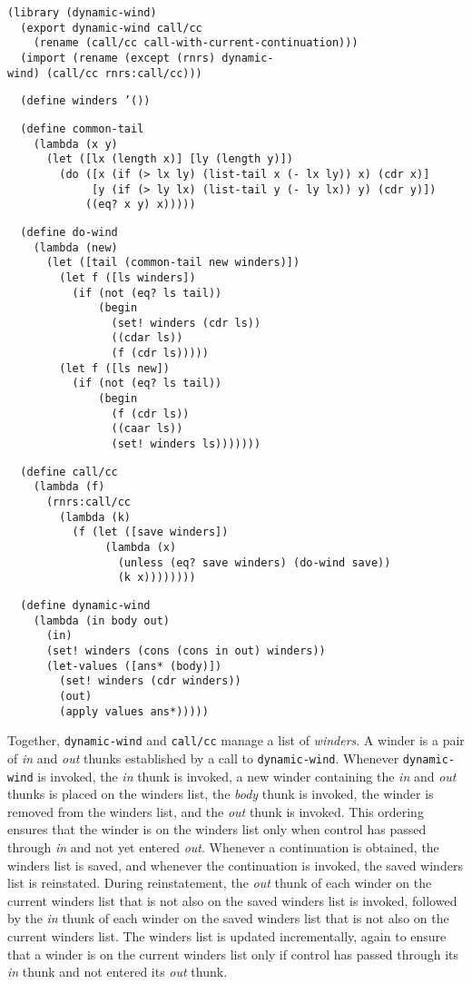 \begin{alltt}
(library (dynamic-wind)
  (export dynamic-wind call/cc
    (rename (call/cc call-with-current-continuation)))
  (import (rename (except (rnrs) dynamic-wind) (call/cc rnrs:call/cc)))

  (define winders '())

  (define common-tail
    (lambda (x y)
      (let ([lx (length x)] [ly (length y)])
        (do ([x (if (\textgreater{} lx ly) (list-tail x (- lx ly)) x) (cdr x)]
             [y (if (\textgreater{} ly lx) (list-tail y (- ly lx)) y) (cdr y)])
            ((eq? x y) x)))))

  (define do-wind
    (lambda (new)
      (let ([tail (common-tail new winders)])
        (let f ([ls winders])
          (if (not (eq? ls tail))
              (begin
                (set! winders (cdr ls))
                ((cdar ls))
                (f (cdr ls)))))
        (let f ([ls new])
          (if (not (eq? ls tail))
              (begin
                (f (cdr ls))
                ((caar ls))
                (set! winders ls)))))))
\end{alltt}


\begin{alltt}
  (define call/cc
    (lambda (f)
      (rnrs:call/cc
        (lambda (k)
          (f (let ([save winders])
               (lambda (x)
                 (unless (eq? save winders) (do-wind save))
                 (k x))))))))

  (define dynamic-wind
    (lambda (in body out)
      (in)
      (set! winders (cons (cons in out) winders))
      (let-values ([ans* (body)])
        (set! winders (cdr winders))
        (out)
        (apply values ans*)))))
\end{alltt}


Together, \texttt{dynamic-wind} and \texttt{call/cc} manage a list
of \label{control_s63}\textit{winders}.
A winder is a pair of \textit{in} and \textit{out} thunks established
by a call to \texttt{dynamic-wind}.
Whenever \texttt{dynamic-wind} is invoked, the \textit{in} thunk is
invoked, a new winder containing the \textit{in} and \textit{out} thunks
is placed on the winders list, the \textit{body} thunk is invoked,
the winder is removed from the winders list, and the \textit{out}
thunk is invoked.
This ordering ensures that the winder is on the winders list only
when control has passed through \textit{in} and not yet entered
\textit{out}.
Whenever a continuation is obtained, the winders list is saved, and
whenever the continuation is invoked, the saved winders list is
reinstated.
During reinstatement, the \textit{out} thunk of each winder on the
current winders list that is not also on the saved winders list is
invoked, followed by the \textit{in} thunk of each winder on the saved
winders list that is not also on the current winders list.
The winders list is updated incrementally, again to ensure that
a winder is on the current winders list only if control has passed
through its \textit{in} thunk and not entered its \textit{out} thunk.


